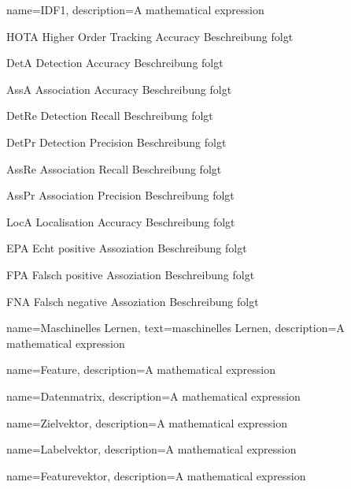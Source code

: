 {
        name=IDF1,
        description={A mathematical expression}
}

\newglossaryentrywithacronym
{HOTA}
{Higher Order Tracking Accuracy}
{Beschreibung folgt}

\newglossaryentrywithacronym
{DetA}
{Detection Accuracy}
{Beschreibung folgt}

\newglossaryentrywithacronym
{AssA}
{Association Accuracy}
{Beschreibung folgt}

\newglossaryentrywithacronym
{DetRe}
{Detection Recall}
{Beschreibung folgt}

\newglossaryentrywithacronym
{DetPr}
{Detection Precision}
{Beschreibung folgt}

\newglossaryentrywithacronym
{AssRe}
{Association Recall}
{Beschreibung folgt}

\newglossaryentrywithacronym
{AssPr}
{Association Precision}
{Beschreibung folgt}

\newglossaryentrywithacronym
{LocA}
{Localisation Accuracy}
{Beschreibung folgt}

\newglossaryentrywithacronym
{EPA}
{Echt positive Assoziation}
{Beschreibung folgt}

\newglossaryentrywithacronym
{FPA}
{Falsch positive Assoziation}
{Beschreibung folgt}

\newglossaryentrywithacronym
{FNA}
{Falsch negative Assoziation}
{Beschreibung folgt}


{
        name=Maschinelles Lernen,
        text=maschinelles Lernen,
        description={A mathematical expression}
}

{
        name=Feature,
        description={A mathematical expression}
}

{
        name=Datenmatrix,
        description={A mathematical expression}
}

{
        name=Zielvektor,
        description={A mathematical expression}
}

{
        name=Labelvektor,
        description={A mathematical expression}
}

{
        name=Featurevektor,
        description={A mathematical expression}
}


